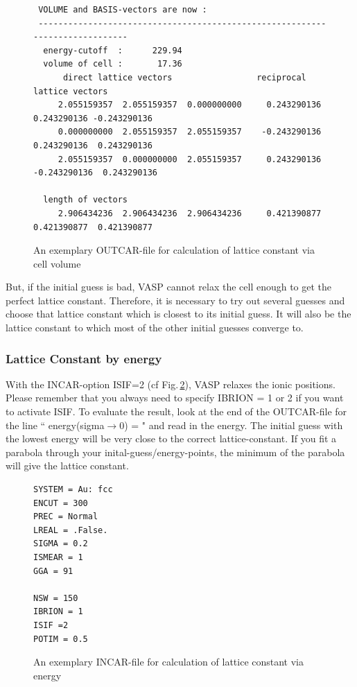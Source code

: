 \documentclass[11pt,oneside,a4paper, captions=nooneline, headsepline]{article}%
\begin{document}
\begin{figure}[h!!]
\begin{verbatim}
 VOLUME and BASIS-vectors are now :
 -----------------------------------------------------------------------------
  energy-cutoff  :      229.94
  volume of cell :       17.36
      direct lattice vectors                 reciprocal lattice vectors
     2.055159357  2.055159357  0.000000000     0.243290136  0.243290136 -0.243290136
     0.000000000  2.055159357  2.055159357    -0.243290136  0.243290136  0.243290136
     2.055159357  0.000000000  2.055159357     0.243290136 -0.243290136  0.243290136

  length of vectors
     2.906434236  2.906434236  2.906434236     0.421390877  0.421390877  0.421390877

\end{verbatim}
\caption{An exemplary OUTCAR-file for calculation of lattice constant via cell volume}
\label{boutcar1}
\end{figure}
But, if the initial guess is bad, VASP cannot relax the cell enough to get the perfect lattice constant. Therefore, it is necessary to try out several guesses and choose that lattice constant which is closest to its initial guess. It will also be the lattice constant to which most of the other initial guesses converge to.\\
\subsubsection*{Lattice Constant by energy}
With the INCAR-option ISIF=2 (cf Fig.\,\ref{bincar2}), VASP relaxes the ionic positions. Please remember that you always need to specify IBRION = 1 or 2 if you want to activate ISIF. To evaluate the result, look at the end of the OUTCAR-file for the line `` energy(sigma$\rightarrow$0) = " and read in the energy. The initial guess with the lowest energy will be very close to the correct lattice-constant. If you fit a parabola through your inital-guess/energy-points, the minimum of the parabola will give the lattice constant.\\
\begin{figure}[h!!]
\begin{verbatim}
SYSTEM = Au: fcc
ENCUT = 300     
PREC = Normal   
LREAL = .False. 
SIGMA = 0.2
ISMEAR = 1              
GGA = 91       

NSW = 150      
IBRION = 1
ISIF =2     
POTIM = 0.5     
\end{verbatim}
\caption{An exemplary INCAR-file for calculation of lattice constant via energy}
\label{bincar2}
\end{figure}
\end{document}
